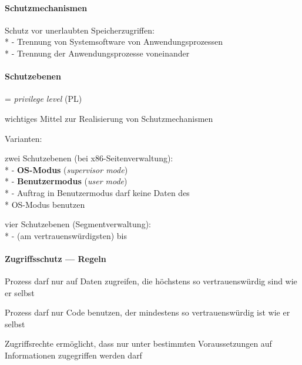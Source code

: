 \paragraph{Schutzmechanismen}
\begin{items}
  \item Schutz vor unerlaubten Speicherzugriffen: \\*
    - Trennung von Systemsoftware von Anwendungsprozessen \\*
    - Trennung der Anwendungsprozesse voneinander
\end{items}

\paragraph{Schutzebenen}
\begin{items}
  \item = \emph{privilege level} (PL)
  \item wichtiges Mittel zur Realisierung von Schutzmechanismen
  \item Varianten:
  \begin{enumeration}
    \item zwei Schutzebenen (bei x86-Seitenverwaltung): \\*
      - \textbf{OS-Modus} (\emph{supervisor mode}) \\*
      - \textbf{Benutzermodus} (\emph{user mode}) \\*
      - Auftrag in Benutzermodus darf keine Daten des \\* \phantom{-} OS-Modus benutzen
    \item vier Schutzebenen (Segmentverwaltung): \\*
      -  (am vertrauenswürdigsten) bis 
  \end{enumeration}
\end{items}

\paragraph{Zugriffsschutz --- Regeln}
\begin{items}
  \item Prozess darf nur auf Daten zugreifen, die höchstens so vertrauenswürdig sind wie er selbst
  \item Prozess darf nur Code benutzen, der mindestens so vertrauenswürdig ist wie er selbst
  \item Zugriffsrechte ermöglicht, dass nur unter bestimmten Voraussetzungen auf Informationen zugegriffen werden darf
\end{items}